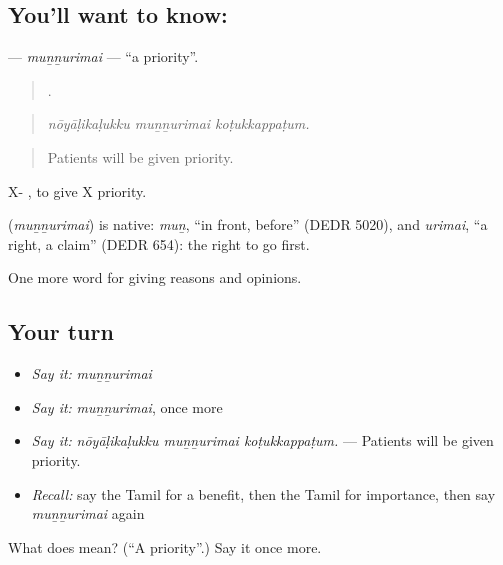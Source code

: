 \subsection*{You'll want to know: }
\textbf{} — \emph{muṉṉurimai} — \textquotedblleft{}a priority\textquotedblright{}.

\begin{quote}
  .
\end{quote}

\begin{quote}
\emph{nōyāḷikaḷukku muṉṉurimai koṭukkappaṭum.}
\end{quote}

\begin{quote}
Patients will be given priority.
\end{quote}

X-  , to give X priority.

\begin{cousinweb}
\textbf{} (\emph{muṉṉurimai}) is native: \emph{muṉ}, \textquotedblleft{}in front, before\textquotedblright{} (DEDR 5020), and \emph{urimai}, \textquotedblleft{}a right, a claim\textquotedblright{} (DEDR 654): the right to go first.
\end{cousinweb}

\begin{grammarlens}[title={What you've built}]
One more word for giving reasons and opinions.
\end{grammarlens}

\subsection*{Your turn}
\begin{itemize}
\raggedright
  \item \emph{Say it:} \emph{muṉṉurimai}
  \item \emph{Say it:} \emph{muṉṉurimai}, once more
  \item \emph{Say it:} \emph{nōyāḷikaḷukku muṉṉurimai koṭukkappaṭum.} — Patients will be given priority.
  \item \emph{Recall:} say the Tamil for a benefit, then the Tamil for importance, then say \emph{muṉṉurimai} again
\end{itemize}

\begin{tcolorbox}[breakable,colback=teal!4,colframe=teal!35!black,title={Before you move on}]
What does  mean? (\textquotedblleft{}A priority\textquotedblright{}.) Say it once more.
\end{tcolorbox}
